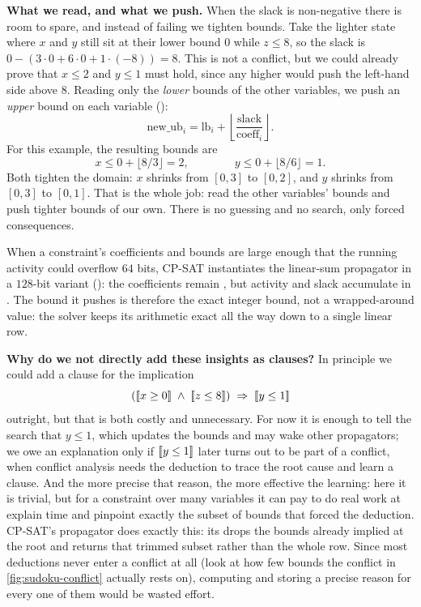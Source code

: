 \textbf{What we read, and what we push.} When the slack is non-negative there is
room to spare, and instead of failing we tighten bounds. Take the lighter state
where $x$ and $y$ still sit at their lower bound $0$ while $z \le 8$, so the slack
is $0 - (3\cdot 0 + 6\cdot 0 + 1\cdot(-8)) = 8$.
This is not a conflict, but we could already prove that $x \le 2$ and $y \le 1$ must hold, since any higher would push the left-hand side above $8$.
Reading only the \emph{lower} bounds of the other
variables, we push an \emph{upper} bound on each variable
():
\[
  \text{new\_ub}_i =
  \text{lb}_i + \left\lfloor \frac{\text{slack}}{\text{coeff}_i} \right\rfloor .
\]
For this example, the resulting bounds are
\[
  x \le 0 + \lfloor 8/3 \rfloor = 2, \qquad\qquad
  y \le 0 + \lfloor 8/6 \rfloor = 1 .
\]
Both tighten the domain: $x$ shrinks from $[0,3]$ to $[0,2]$, and $y$ shrinks
from $[0,3]$ to $[0,1]$. That is the whole job: read the other variables' bounds
and push tighter bounds of our own. There is no guessing and no search, only
forced consequences.
\begin{platypusinfo}[htb]
When a constraint's coefficients and bounds are large enough that the running
activity could overflow $64$ bits, CP-SAT instantiates the linear-sum propagator
in a $128$-bit variant (): the
coefficients remain , but activity and slack accumulate in
. The bound it pushes is therefore the exact integer bound, not a
wrapped-around value: the solver keeps its arithmetic exact all the way down to a
single linear row.
\end{platypusinfo}

\textbf{Why do we not directly add these insights as clauses?}
In principle we could add a clause for the implication
\[
  ([\![x \ge 0]\!] \;\wedge\; [\![z \le 8]\!]) \;\Rightarrow\; [\![y \le 1]\!]
\]
outright, but that is both costly and unnecessary. For now it is enough to tell the
search that $y \le 1$, which updates the bounds and may wake other propagators; we
owe an explanation only if $[\![y \le 1]\!]$ later turns out to be part of a conflict, when
conflict analysis needs the deduction to trace the root cause and learn a clause.
And the more precise that reason, the more effective the learning: here it is
trivial, but for a constraint over many variables it can pay to do real work at
explain time and pinpoint exactly the subset of bounds that forced the deduction.
CP-SAT's  propagator does
exactly this: its  drops the bounds already implied at the root and
returns that trimmed subset rather than the whole row. Since most deductions never
enter a conflict at all (look at how few bounds the conflict in
\cref{fig:sudoku-conflict} actually rests on), computing and storing a precise
reason for every one of them would be wasted effort.


